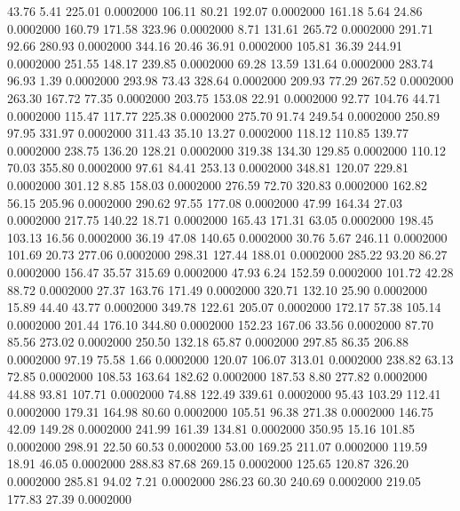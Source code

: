   43.76    5.41  225.01   0.0002000
 106.11   80.21  192.07   0.0002000
 161.18    5.64   24.86   0.0002000
 160.79  171.58  323.96   0.0002000
   8.71  131.61  265.72   0.0002000
 291.71   92.66  280.93   0.0002000
 344.16   20.46   36.91   0.0002000
 105.81   36.39  244.91   0.0002000
 251.55  148.17  239.85   0.0002000
  69.28   13.59  131.64   0.0002000
 283.74   96.93    1.39   0.0002000
 293.98   73.43  328.64   0.0002000
 209.93   77.29  267.52   0.0002000
 263.30  167.72   77.35   0.0002000
 203.75  153.08   22.91   0.0002000
  92.77  104.76   44.71   0.0002000
 115.47  117.77  225.38   0.0002000
 275.70   91.74  249.54   0.0002000
 250.89   97.95  331.97   0.0002000
 311.43   35.10   13.27   0.0002000
 118.12  110.85  139.77   0.0002000
 238.75  136.20  128.21   0.0002000
 319.38  134.30  129.85   0.0002000
 110.12   70.03  355.80   0.0002000
  97.61   84.41  253.13   0.0002000
 348.81  120.07  229.81   0.0002000
 301.12    8.85  158.03   0.0002000
 276.59   72.70  320.83   0.0002000
 162.82   56.15  205.96   0.0002000
 290.62   97.55  177.08   0.0002000
  47.99  164.34   27.03   0.0002000
 217.75  140.22   18.71   0.0002000
 165.43  171.31   63.05   0.0002000
 198.45  103.13   16.56   0.0002000
  36.19   47.08  140.65   0.0002000
  30.76    5.67  246.11   0.0002000
 101.69   20.73  277.06   0.0002000
 298.31  127.44  188.01   0.0002000
 285.22   93.20   86.27   0.0002000
 156.47   35.57  315.69   0.0002000
  47.93    6.24  152.59   0.0002000
 101.72   42.28   88.72   0.0002000
  27.37  163.76  171.49   0.0002000
 320.71  132.10   25.90   0.0002000
  15.89   44.40   43.77   0.0002000
 349.78  122.61  205.07   0.0002000
 172.17   57.38  105.14   0.0002000
 201.44  176.10  344.80   0.0002000
 152.23  167.06   33.56   0.0002000
  87.70   85.56  273.02   0.0002000
 250.50  132.18   65.87   0.0002000
 297.85   86.35  206.88   0.0002000
  97.19   75.58    1.66   0.0002000
 120.07  106.07  313.01   0.0002000
 238.82   63.13   72.85   0.0002000
 108.53  163.64  182.62   0.0002000
 187.53    8.80  277.82   0.0002000
  44.88   93.81  107.71   0.0002000
  74.88  122.49  339.61   0.0002000
  95.43  103.29  112.41   0.0002000
 179.31  164.98   80.60   0.0002000
 105.51   96.38  271.38   0.0002000
 146.75   42.09  149.28   0.0002000
 241.99  161.39  134.81   0.0002000
 350.95   15.16  101.85   0.0002000
 298.91   22.50   60.53   0.0002000
  53.00  169.25  211.07   0.0002000
 119.59   18.91   46.05   0.0002000
 288.83   87.68  269.15   0.0002000
 125.65  120.87  326.20   0.0002000
 285.81   94.02    7.21   0.0002000
 286.23   60.30  240.69   0.0002000
 219.05  177.83   27.39   0.0002000
